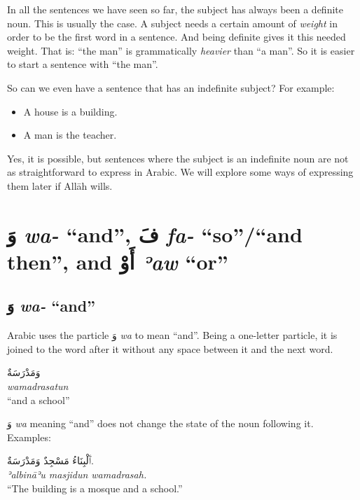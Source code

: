 \documentclass[
  10pt,
]{book}
\providecommand{\tightlist}{%
  \setlength{\itemsep}{0pt}\setlength{\parskip}{0pt}}
\begin{document}
In all the sentences we have seen so far, the subject has always been a definite noun. This is usually the case. A subject needs a certain amount of \emph{weight} in order to be the first word in a sentence. And being definite gives it this needed weight. That is: \enquote{the man} is grammatically \emph{heavier} than \enquote{a man}. So it is easier to start a sentence with \enquote{the man}.

So can we even have a sentence that has an indefinite subject? For example:

\begin{itemize}
\tightlist
\item
  A house is a building.
\item
  A man is the teacher.
\end{itemize}

Yes, it is possible, but sentences where the subject is an indefinite noun are not as straightforward to express in Arabic. We will explore some ways of expressing them later if Allāh wills.

\section{\texorpdfstring{\foreignlanguage{arabic}{وَ} \emph{wa-} \enquote{and}, \foreignlanguage{arabic}{فَ} \emph{fa-} \enquote{so}/\enquote{and then}, and \foreignlanguage{arabic}{أَوْ} \emph{ʾaw} \enquote{or}}{وَ wa- ``and'', فَ fa- ``so''/``and then'', and أَوْ ʾaw ``or''}}\label{ux648-wa--and-ux641-fa--soand-then-and-ux623ux648-eaw-or}

\subsection{\texorpdfstring{\foreignlanguage{arabic}{وَ} \emph{wa-} \enquote{and}}{وَ wa- ``and''}}\label{ux648-wa--and}

Arabic uses the particle \foreignlanguage{arabic}{وَ} \emph{wa} to mean \enquote{and}. Being a one-letter particle, it is joined to the word after it without any space between it and the next word.

\foreignlanguage{arabic}{وَمَدْرَسَةٌ}\\
\emph{wamadrasatun}\\
\enquote{and a school}

\foreignlanguage{arabic}{وَ} \emph{wa} meaning \enquote{and} does not change the state of the noun following it. Examples:

\foreignlanguage{arabic}{ٱَلْبِنَاءُ مَسْجِدٌ وَمَدْرَسَةٌ.}\\
\emph{ʾalbināʾu masjidun wamadrasah.}\\
\enquote{The building is a mosque and a school.}
\end{document}
